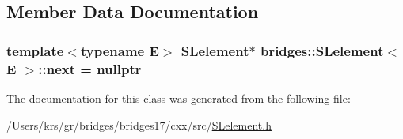 \subsection{Member Data Documentation}
\hypertarget{classbridges_1_1_s_lelement_ad7449d10a09ebc52653a7baed812aa43}{}
\subsubsection[{next}]{\setlength{\rightskip}{0pt plus 5cm}template$<$typename E$>$ {\bf S\+Lelement}$\ast$ {\bf bridges\+::\+S\+Lelement}$<$ E $>$\+::next = nullptr\hspace{0.3cm}{\ttfamily [protected]}}\label{classbridges_1_1_s_lelement_ad7449d10a09ebc52653a7baed812aa43}


The documentation for this class was generated from the following file\+:\begin{DoxyCompactItemize}
\item 
/\+Users/krs/gr/bridges/bridges17/cxx/src/\hyperlink{_s_lelement_8h}{S\+Lelement.\+h}\end{DoxyCompactItemize}
